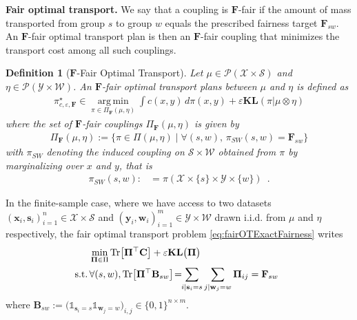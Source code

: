 \documentclass{article}
\DeclareMathOperator*{\argmin}{arg\,min}
\newcommand{\kl}{\mathbf{KL}}
\newtheorem{defn}[thm]{Definition}
\theoremstyle{definition}
\begin{document}
\textbf{Fair optimal transport.} We say that a coupling is $\mathbf{F}$-fair if the amount of mass transported from group $s$ to group $w$ equals the prescribed fairness target $\mathbf{F}_{sw}$. An $\mathbf{F}$-fair optimal transport plan is then an $\mathbf{F}$-fair coupling that minimizes the transport cost among all such couplings.
\begin{defn}[$\mathbf{F}$-Fair Optimal Transport]
\label{def:fair_ot}
        Let $\mu\in \mathcal{P}(\mathcal{X}\times \mathcal{S})$ and  $\eta \in \mathcal{P}(\mathcal{Y}\times \mathcal{W})$. An $\mathbf{F}$-fair optimal transport plans between $\mu$ and $\eta$ is defined as
\begin{align}
    \label{eq:fairOTExactFairness}
     \pi^\star_{c,\varepsilon,\mathbf{F}} \!\in\!\! \argmin\limits_{\pi \in \Pi_\mathbf{F}(\mu,\eta)} \int\!\! c(x,y)\,d\pi(x,y) \!+\! \varepsilon \mathbf{KL}(\pi| \mu \otimes \eta)
\end{align} where the set of $\mathbf{F}$-fair couplings $\Pi_\mathbf{F}(\mu,\eta)$ is given by
\begin{align*}
    \Pi_\mathbf{F}(\mu,\eta) := \big\{ \pi \in  \Pi(\mu,\eta) \mid \forall (s,w), \, \pi_{SW}(s,w) = \mathbf{F}_{sw}\big\}
\end{align*}
    with $\pi_{SW}$ denoting the induced coupling on $\mathcal{S}\times \mathcal{W}$ obtained from $\pi$ by marginalizing over $x$ and $y$, that is
    \begin{align*}
        \pi_{SW}(s,w):&=\pi(\mathcal{X}\times\lbrace s\rbrace\times\mathcal{Y}\times \lbrace w\rbrace)\enspace.
    \end{align*}
\end{defn}
In the finite-sample case, where we have access to two datasets $(\mathbf{x}_i,\mathbf{s}_i)_{i=1}^n \in \mathcal{X}\times \mathcal{S}$ and $(\mathbf{y}_i,\mathbf{w}_i)_{i=1}^m \in \mathcal{Y}\times \mathcal{W}$ drawn i.i.d. from  $\mu$ and $\eta$ respectively, the fair optimal transport problem \eqref{eq:fairOTExactFairness} writes
\begin{align}
\begin{aligned}
\label{eq:pure_empirical_fairness}
    & \min\limits_{\mathbf{\Pi} \in \Pi} \textnormal{Tr}\big[\mathbf{\Pi}^\top \mathbf{C}\big] + \varepsilon\kl\big(\mathbf{\Pi}\big)\\
    \textnormal{s.t.} \,&  \forall (s,w), \textnormal{Tr}\big[\mathbf{\Pi}^\top\mathbf{B}_{sw}\big] \!=\!\! \sum\limits_{i | \mathbf{s}_i=s}\sum\limits_{j | \mathbf{w}_j=w} \mathbf{\Pi}_{ij}=  \mathbf{F}_{sw}\enspace
\end{aligned}
\end{align}
where $\mathbf{B}_{sw} := \big(\mathds{1}_{\mathbf{s}_i = s}\mathds{1}_{\mathbf{w}_j = w}\big)_{i,j} \in \{0,1\}^{n \times m}$.
\end{document}
